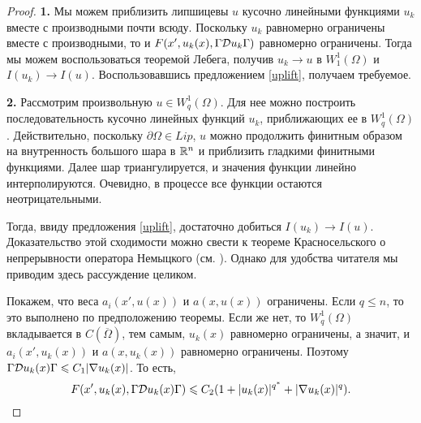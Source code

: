 \begin{proof}
\textbf{1.} Мы можем приблизить липшицевы $u$ кусочно линейными функциями $u_k$ вместе с производными почти всюду.
Поскольку $u_k$ равномерно ограничены вместе с производными,
то и $F(x', u_k(x), \norm{\mathcal{D} u_k})$ равномерно ограничены.
Тогда мы можем воспользоваться теоремой Лебега, получив $u_k \to u$ в $W^1_1(\Omega)$ и $I( u_k ) \to I( u )$.
Воспользовавшись предложением \ref{uplift}, получаем требуемое.

\textbf{2.} Рассмотрим произвольную $u \in W^1_q(\Omega)$.
Для нее можно построить последовательность кусочно линейных функций $u_k$, приближающих ее в $W^1_q(\Omega)$.
Действительно, поскольку $\partial \Omega \in Lip$,
$u$ можно продолжить финитным образом на внутренность большого шара в $\mathbb R^n$
и приблизить гладкими финитными функциями.
Далее шар триангулируется, и значения функции линейно интерполируются.
Очевидно, в процессе все функции остаются неотрицательными.

Тогда, ввиду предложения \ref{uplift}, достаточно добиться $I( u_k ) \to I( u )$.
Доказательство этой сходимости можно свести к теореме Красносельского о непрерывности
оператора Немыцкого (см. \cite[гл. 5, ]{Krasnoselsky}).
Однако для удобства читателя мы приводим здесь рассуждение целиком.

Покажем, что веса $a_i(x', u(x))$ и $a(x, u(x))$ ограничены.
Если $q \le n$, то это выполнено по предположению теоремы. Если же нет, то $W^1_q(\Omega)$ вкладывается в $C(\overline{\Omega})$,
тем самым, $u_k(x)$ равномерно ограничены, а значит, и $a_i(x', u_k(x))$ и $a(x, u_k(x))$ равномерно ограничены.
Поэтому $\norm{ \mathcal{D} u_k( x ) } \le C_1 |\nabla u_k( x )|$.
То есть,
$$F( x', u_k( x ), \norm{ \mathcal{D} u_k( x ) } ) \le C_2 ( 1 + |u_k( x )|^{q^*} + |\nabla u_k( x )|^q ).$$



\end{proof}
